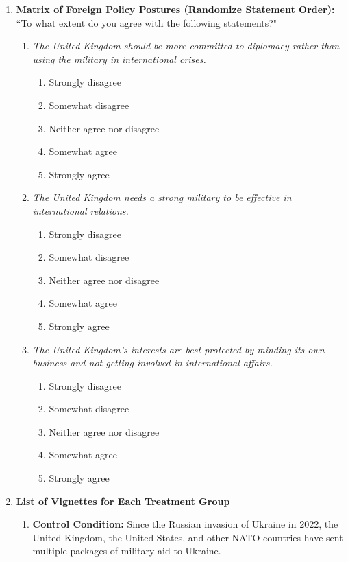 \begin{appendices}
\begin{enumerate}
    \item \textbf{Matrix of Foreign Policy Postures (Randomize Statement Order):} ``To what extent do you agree with the following statements?"
    \begin{enumerate}
        \item \textit{The United Kingdom should be more committed to diplomacy rather than using the military in international crises.}
        \begin{enumerate}
            \item Strongly disagree
            \item Somewhat disagree
            \item Neither agree nor disagree
            \item Somewhat agree
            \item Strongly agree
        \end{enumerate}
        \item \textit{The United Kingdom needs a strong military to be effective in international relations.}
        \begin{enumerate}
            \item Strongly disagree
            \item Somewhat disagree
            \item Neither agree nor disagree
            \item Somewhat agree
            \item Strongly agree
        \end{enumerate}
        \item \textit{The United Kingdom's interests are best protected by minding its own business and not getting involved in international affairs.}
        \begin{enumerate}
            \item Strongly disagree
            \item Somewhat disagree
            \item Neither agree nor disagree
            \item Somewhat agree
            \item Strongly agree
        \end{enumerate}
    \end{enumerate}
    \item \textbf{List of Vignettes for Each Treatment Group}
    \begin{enumerate}
        \item \textbf{Control Condition:} Since the Russian invasion of Ukraine in 2022, the United Kingdom, the United States, and other NATO countries have sent multiple packages of military aid to Ukraine.

\end{enumerate}
\end{enumerate}
\end{appendices}
